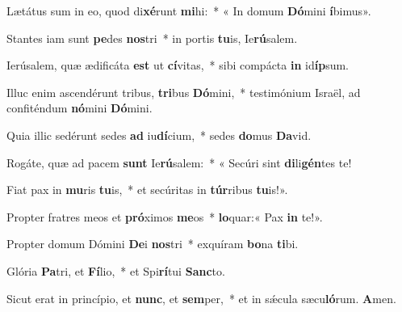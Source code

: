 \item Lætátus sum in eo, quod di\textbf{xé}runt \textbf{mi}hi:~* « In domum \textbf{Dó}mini \textbf{í}bimus».

\item Stantes iam sunt \textbf{pe}des \textbf{nos}tri~* in portis \textbf{tu}is, Ie\textbf{rú}salem.

\item Ierúsalem, quæ ædificáta \textbf{est} ut \textbf{cí}vitas,~* sibi compácta \textbf{in} id\textbf{íp}sum.

\item Illuc enim ascendérunt tribus, \textbf{tri}bus \textbf{Dó}mini,~* testimónium Israël, ad confiténdum \textbf{nó}mini \textbf{Dó}mini.

\item Quia illic sedérunt sedes \textbf{ad} iu\textbf{dí}cium,~* sedes \textbf{do}mus \textbf{Da}vid.

\item Rogáte, quæ ad pacem \textbf{sunt} Ie\textbf{rú}salem:~* « Secúri sint \textbf{di}li\textbf{gén}tes te!

\item Fiat pax in \textbf{mu}ris \textbf{tu}is,~* et secúritas in \textbf{túr}ribus \textbf{tu}is!».

\item Propter fratres meos et \textbf{pró}ximos \textbf{me}os~* \textbf{lo}quar:« Pax \textbf{in} te!».

\item Propter domum Dómini \textbf{De}i \textbf{nos}tri~* exquíram \textbf{bo}na \textbf{ti}bi.

\item Glória \textbf{Pa}tri, et \textbf{Fí}lio,~* et Spi\textbf{rí}tui \textbf{Sanc}to.

\item Sicut erat in princípio, et \textbf{nunc}, et \textbf{sem}per,~* et in sǽcula sæcu\textbf{ló}rum. \textbf{A}men.